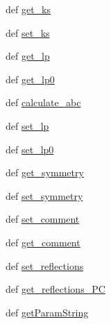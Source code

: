 \begin{DoxyCompactItemize}
def \hyperlink{class_j_c_p_d_s_1_1_j_c_p_d_s_a32a90e34a4d32069f00a6f6537dc91dc}{get\-\_\-ks}
\item 
def \hyperlink{class_j_c_p_d_s_1_1_j_c_p_d_s_a36e77efd2364a3f81ef463ffb959d07e}{set\-\_\-ks}
\item 
def \hyperlink{class_j_c_p_d_s_1_1_j_c_p_d_s_a06b183ba8881c7197a063b860083dfd8}{get\-\_\-lp}
\item 
def \hyperlink{class_j_c_p_d_s_1_1_j_c_p_d_s_aabe3f59ba92dfb4712082c77d74a28b0}{get\-\_\-lp0}
\item 
def \hyperlink{class_j_c_p_d_s_1_1_j_c_p_d_s_a957b63b325687580b686ea88741fdfb8}{calculate\-\_\-abc}
\item 
def \hyperlink{class_j_c_p_d_s_1_1_j_c_p_d_s_aaf4441ec7e191848281e381982568c74}{set\-\_\-lp}
\item 
def \hyperlink{class_j_c_p_d_s_1_1_j_c_p_d_s_abe8101e5474e729f2d067fcc61561a31}{set\-\_\-lp0}
\item 
def \hyperlink{class_j_c_p_d_s_1_1_j_c_p_d_s_a92e518955551c7e65dad79bb40d5181a}{get\-\_\-symmetry}
\item 
def \hyperlink{class_j_c_p_d_s_1_1_j_c_p_d_s_a8cd753161864e176f79874f9ee55ca9b}{set\-\_\-symmetry}
\item 
def \hyperlink{class_j_c_p_d_s_1_1_j_c_p_d_s_ab2c9774755de8f1b98fbd75fca00281e}{set\-\_\-comment}
\item 
def \hyperlink{class_j_c_p_d_s_1_1_j_c_p_d_s_ab93dd1b1d99684d5ee51713afc042413}{get\-\_\-comment}
\item 
def \hyperlink{class_j_c_p_d_s_1_1_j_c_p_d_s_adf2e6b325f00594a550653a6a150215d}{set\-\_\-reflections}
\item 
def \hyperlink{class_j_c_p_d_s_1_1_j_c_p_d_s_a125df1699b3e7f91e14e19c7035152e9}{get\-\_\-reflections\-\_\-\-P\-C}
\item 
def \hyperlink{class_j_c_p_d_s_1_1_j_c_p_d_s_a1d48c932a6349263167926e057807c3f}{get\-Param\-String}
\end{DoxyCompactItemize}
